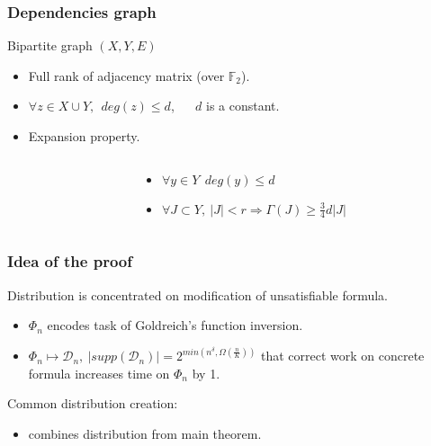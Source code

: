 \begin{frame}
    \frametitle{Dependencies graph}

    Bipartite graph $(X, Y, E)$
    \pause
    \begin{itemize}
	    \item Full rank of adjacency matrix (over $\mathbb{F}_2$).
    	\pause
        \item $\forall z \in X \cup Y, ~~ deg(z) \le d$, ~~ $d$ is a constant.
    	\pause
        \item Expansion property.
    \end{itemize}

    \pause

    \begin{columns}
        \begin{column}{5cm}
            
        \end{column}

        \pause
        \pause
        \pause
        \begin{column}{5cm}
            \begin{itemize}
                \item $\forall y \in Y ~~ deg(y) \le d$
            	\pause
	            \item $\forall J \subset Y, ~
            		|J| < r \Rightarrow \Gamma(J) \ge \frac{3}{4}d|J|$
            \end{itemize}
		\end{column}
    \end{columns}

\end{frame}

\begin{frame}
	\frametitle{Idea of the proof}

    \pause
    Distribution is concentrated on modification of unsatisfiable formula.
	\pause
    \begin{itemize}
        \item $\Phi_n$ encodes task of Goldreich's function inversion.
    	\pause
    	\item $\Phi_n \mapsto \mathcal{D}_n, ~ |supp(\mathcal{D}_n)| =
		    2^{min(n^\delta, \Omega(\frac{n}{K}))}$ that correct work
            on concrete formula increases time on $\Phi_n$ by 1.
	\end{itemize}

    \pause
    Common distribution creation:
    
    \pause
    \begin{itemize}
        \item combines distribution from main theorem.
    \end{itemize}
\end{frame}
